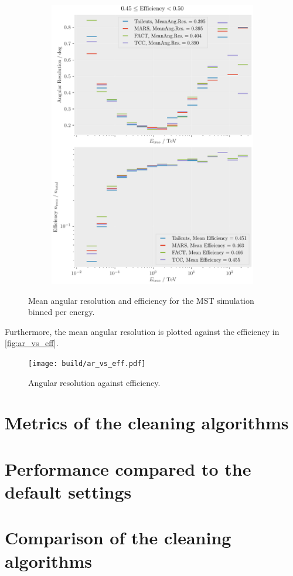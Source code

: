 \begin{figure}
\begin{subfigure}{0.48\textwidth}
        \includegraphics[width=\textwidth]{plots/ar_aeff/AR_Aeff_MST_0.45_0.50.pdf}
    \end{subfigure}
    \caption{Mean angular resolution and efficiency for the MST simulation binned per energy. }
    \label{fig:efficiency_angres}
\end{figure}

Furthermore, the mean angular resolution is plotted against the efficiency in \autoref{fig:ar_vs_eff}.

\begin{figure}
    \centering
    \texttt{[image: build/ar\_vs\_eff.pdf]}
    \caption{Angular resolution against efficiency.}
    \label{fig:ar_vs_eff}
\end{figure}


\section{Metrics of the cleaning algorithms}
\label{sec:metrics}




\section{Performance compared to the default settings}
\label{sec:performance}


\section{Comparison of the cleaning algorithms}
\label{sec:comparison}